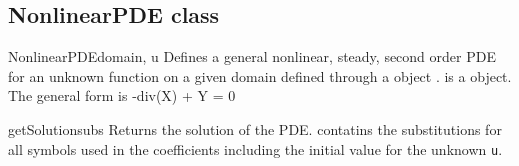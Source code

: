 \subsection{NonlinearPDE class}
\begin{classdesc}{NonlinearPDE}{domain, u}
Defines a general nonlinear, steady, second order PDE for an unknown function
 on a given domain defined through a \Domain object .
 is a \SYMBOL object.
The general form is -div(X) + Y = 0 
\end{classdesc}
\iffalse
\begin{methoddesc}[NonlinearPDE]{concatenateRow}{}
test
\end{methoddesc}
\begin{methoddesc}[NonlinearPDE]{createCoefficient}{}
test
\end{methoddesc}
\begin{methoddesc}[NonlinearPDE]{getUnknownSymbol}{}
test
\end{methoddesc}
\begin{methoddesc}[NonlinearPDE]{getLinearSolverOptions}{}
test
\end{methoddesc}
\begin{methoddesc}[NonlinearPDE]{getLinearPDE}{}
test
\end{methoddesc}
\begin{methoddesc}[NonlinearPDE]{getNumSolutions}{}
test
\end{methoddesc}
\begin{methoddesc}[NonlinearPDE]{getShapeOfCoefficient}{}
test
\end{methoddesc}
\begin{methoddesc}[NonlinearPDE]{getCoefficient}{}
test
\end{methoddesc}
\begin{methoddesc}[NonlinearPDE]{getSensitivity}{}
test
\end{methoddesc}
\fi
\begin{methoddesc}[NonlinearPDE]{getSolution}{subs}
Returns the solution of the PDE.  contatins the substitutions for
all symbols used in the coefficients including the initial value for the
unknown \texttt{u}.
\end{methoddesc}
